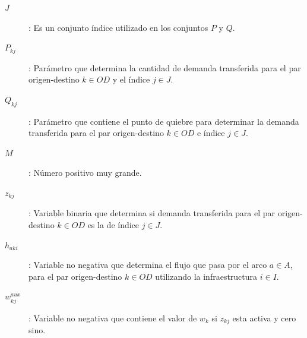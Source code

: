 \documentclass{article}
\begin{document}
  \begin{description}
    \item[$J$]: Es un conjunto índice utilizado en los conjuntos $P$ y $Q$.
    \item[$P_{kj}$]: Parámetro que determina la cantidad de demanda transferida para el par origen-destino $k \in OD$ y el índice $j \in J$.
    \item[$Q_{kj}$]: Parámetro que contiene el punto de quiebre para determinar la demanda transferida para el par origen-destino $k \in OD$ e índice $j \in J$.
    \item[$M$]: Número positivo muy grande. 
    \item[$z_{kj}$]: Variable binaria que determina si demanda transferida para el par origen-destino $k \in OD$ es la de índice $j \in J$.
    \item[$h_{aki}$]: Variable no negativa que determina el flujo que pasa por el arco $a \in A$, para el par origen-destino $k \in OD$ utilizando la infraestructura $i \in I$.
    \item[$w^{aux}_{kj}$]: Variable no negativa que contiene el valor de $w_{k}$ si $z_{kj}$ esta activa y cero sino. 
  \end{description}
\end{document}
